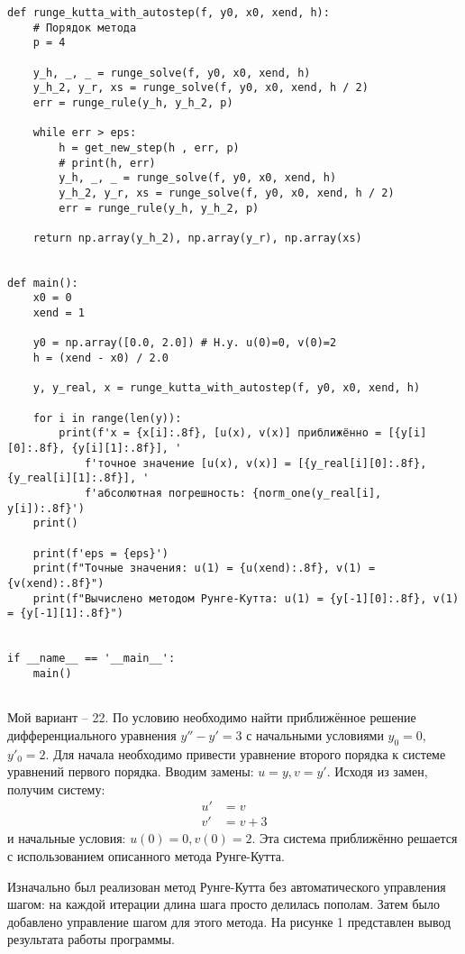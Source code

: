 \documentclass[a4paper, 14pt]{extarticle}
\begin{document}
\begin{verbatim}
def runge_kutta_with_autostep(f, y0, x0, xend, h):
	# Порядок метода
	p = 4
	
	y_h, _, _ = runge_solve(f, y0, x0, xend, h)
	y_h_2, y_r, xs = runge_solve(f, y0, x0, xend, h / 2)
	err = runge_rule(y_h, y_h_2, p)
	
	while err > eps:
		h = get_new_step(h , err, p)
		# print(h, err)
		y_h, _, _ = runge_solve(f, y0, x0, xend, h)
		y_h_2, y_r, xs = runge_solve(f, y0, x0, xend, h / 2)
		err = runge_rule(y_h, y_h_2, p)
	
	return np.array(y_h_2), np.array(y_r), np.array(xs)


def main():
	x0 = 0
	xend = 1
	
	y0 = np.array([0.0, 2.0]) # Н.у. u(0)=0, v(0)=2
	h = (xend - x0) / 2.0
	
	y, y_real, x = runge_kutta_with_autostep(f, y0, x0, xend, h)
	
	for i in range(len(y)):
		print(f'x = {x[i]:.8f}, [u(x), v(x)] приближённо = [{y[i][0]:.8f}, {y[i][1]:.8f}], '
			f'точное значение [u(x), v(x)] = [{y_real[i][0]:.8f}, {y_real[i][1]:.8f}], '
			f'абсолютная погрешность: {norm_one(y_real[i], y[i]):.8f}')
	print()
	
	print(f'eps = {eps}')
	print(f"Точные значения: u(1) = {u(xend):.8f}, v(1) = {v(xend):.8f}")
	print(f"Вычислено методом Рунге-Кутта: u(1) = {y[-1][0]:.8f}, v(1) = {y[-1][1]:.8f}")


if __name__ == '__main__':
	main()


\end{verbatim}

Мой вариант -- 22. По условию необходимо найти приближённое решение дифференциального уравнения $y'' - y' = 3$ с 
начальными условиями $y_0 = 0$, $y'_0 = 2$.
Для начала необходимо привести уравнение второго порядка к системе уравнений первого порядка. Вводим замены:
$u = y, v = y'$. Исходя из замен, получим систему:
\begin{equation*}
	\begin{aligned}
		u' &= v \\
		v' &= v + 3
	\end{aligned}
\end{equation*}
и начальные условия: $u(0) = 0, v(0) = 2$. Эта система приближённо решается с использованием описанного метода Рунге-Кутта.

Изначально был реализован метод Рунге-Кутта без автоматического управления шагом: на каждой итерации длина шага просто 
делилась пополам. Затем было добавлено управление шагом для этого метода. На рисунке 
1 представлен вывод результата работы программы. 
\end{document}
